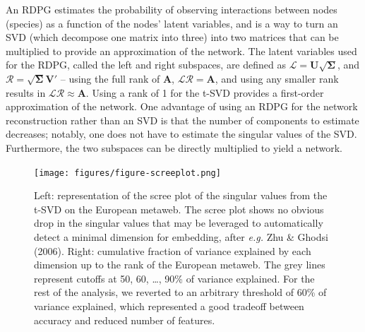 \documentclass[11pt]{article}
\begin{document}
An RDPG estimates the probability of observing interactions between
nodes (species) as a function of the nodes' latent variables, and is a
way to turn an SVD (which decompose one matrix into three) into two
matrices that can be multiplied to provide an approximation of the
network. The latent variables used for the RDPG, called the left and
right subspaces, are defined as
\(\mathscr{L} = \mathbf{U}\sqrt{\mathbf{\Sigma}}\), and
\(\mathscr{R} = \sqrt{\mathbf{\Sigma}}\mathbf{V}'\) -- using the full
rank of \(\mathbf{A}\), \(\mathscr{L}\mathscr{R} = \mathbf{A}\), and
using any smaller rank results in
\(\mathscr{L}\mathscr{R} \approx \mathbf{A}\). Using a rank of 1 for the
t-SVD provides a first-order approximation of the network. One advantage
of using an RDPG for the network reconstruction rather than an SVD is
that the number of components to estimate decreases; notably, one does
not have to estimate the singular values of the SVD. Furthermore, the
two subspaces can be directly multiplied to yield a network.

\begin{figure}
\hypertarget{fig:scree}{%
\centering
\texttt{[image: figures/figure-screeplot.png]}
\caption{Left: representation of the scree plot of the singular values
from the t-SVD on the European metaweb. The scree plot shows no obvious
drop in the singular values that may be leveraged to automatically
detect a minimal dimension for embedding, after \emph{e.g.} Zhu \&
Ghodsi (2006). Right: cumulative fraction of variance explained by each
dimension up to the rank of the European metaweb. The grey lines
represent cutoffs at 50, 60, \ldots, 90\% of variance explained. For the
rest of the analysis, we reverted to an arbitrary threshold of 60\% of
variance explained, which represented a good tradeoff between accuracy
and reduced number of features.}\label{fig:scree}
}
\end{figure}
\end{document}
